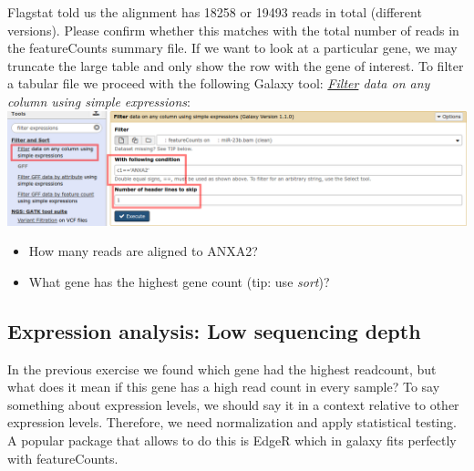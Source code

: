 Flagstat told us the alignment has 18258 or 19493 reads in total (different versions).
Please confirm whether this matches with the total number of reads in the featureCounts summary file.
If we want to look at a particular gene, we may truncate the large table and only show the row with the gene of interest.
To filter a tabular file we proceed with the following Galaxy tool: 
\textit{\underline{Filter} data on any column using simple expressions}:\\
\includegraphics[width=\textwidth]{figures/expression_02.png}\\
\begin{itemize}
	\item How many reads are aligned to ANXA2?
	\item What gene has the highest gene count (tip: use \textit{sort})?
\end{itemize}

\subsection{Expression analysis: Low sequencing depth}
In the previous exercise we found which gene had the highest readcount, but what does it mean if this gene has a high read count in every sample? To say something about expression levels, we should say it in a context relative to other expression levels. Therefore, we need normalization and apply statistical testing. A popular package that allows to do this is EdgeR which in galaxy fits perfectly with featureCounts.

